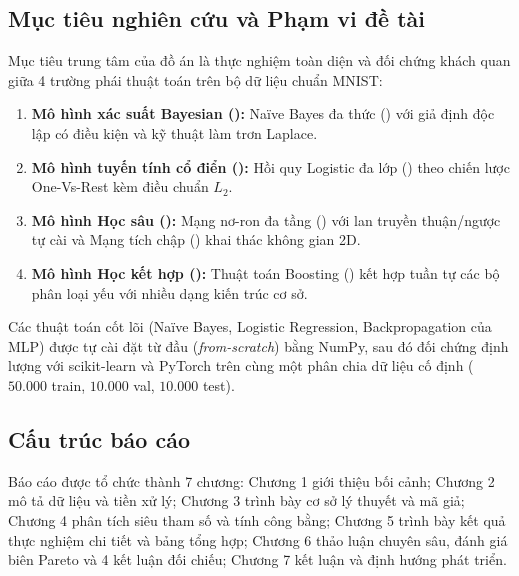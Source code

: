 \subsection{Mục tiêu nghiên cứu và Phạm vi đề tài}
Mục tiêu trung tâm của đồ án là thực nghiệm toàn diện và đối chứng khách quan giữa 4 trường phái thuật toán trên bộ dữ liệu chuẩn MNIST:
\begin{enumerate}
    \item \textbf{Mô hình xác suất Bayesian ():} Naïve Bayes đa thức () với giả định độc lập có điều kiện và kỹ thuật làm trơn Laplace.
    \item \textbf{Mô hình tuyến tính cổ điển ():} Hồi quy Logistic đa lớp () theo chiến lược One-Vs-Rest kèm điều chuẩn $L_2$.
    \item \textbf{Mô hình Học sâu ():} Mạng nơ-ron đa tầng () với lan truyền thuận/ngược tự cài và Mạng tích chập () khai thác không gian 2D.
    \item \textbf{Mô hình Học kết hợp ():} Thuật toán Boosting () kết hợp tuần tự các bộ phân loại yếu với nhiều dạng kiến trúc cơ sở.
\end{enumerate}
Các thuật toán cốt lõi (Naïve Bayes, Logistic Regression, Backpropagation của MLP) được tự cài đặt từ đầu (\textit{from-scratch}) bằng NumPy, sau đó đối chứng định lượng với scikit-learn và PyTorch trên cùng một phân chia dữ liệu cố định ($50.000$ train, $10.000$ val, $10.000$ test).

\subsection{Cấu trúc báo cáo}
Báo cáo được tổ chức thành 7 chương: Chương 1 giới thiệu bối cảnh; Chương 2 mô tả dữ liệu và tiền xử lý; Chương 3 trình bày cơ sở lý thuyết và mã giả; Chương 4 phân tích siêu tham số và tính công bằng; Chương 5 trình bày kết quả thực nghiệm chi tiết và bảng tổng hợp; Chương 6 thảo luận chuyên sâu, đánh giá biên Pareto và 4 kết luận đối chiếu; Chương 7 kết luận và định hướng phát triển.
